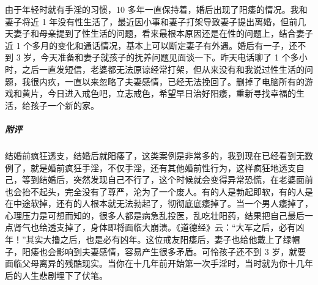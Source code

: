 \begin{case}
    由于年轻时就有手淫的习惯，10 多年一直保持着，婚后出现了阳痿的情况。我和妻子将近 1 年没有性生活了，最近因小事和妻子打架导致妻子提出离婚，但前几天妻子和母亲提到了性生活的问题，看来最根本原因还是在性的问题上，结合妻子近 1 个多月的变化和通话情况，基本上可以断定妻子有外遇。婚后有一子，还不到 3 岁，今天准备和妻子就孩子的抚养问题见面谈一下。昨天电话聊了 1 个多小时，之后一直发短信，老婆都无法原谅经常打架，但从来没有和我说过性生活的问题，我很内疚，一直以来忽略了夫妻感情，已经无法挽回了。删掉了电脑所有的游戏和黄片，今日进入戒色吧，立志戒色，希望早日治好阳痿，重新寻找幸福的生活，给孩子一个新的家。
    \subparagraph{附评} 结婚前疯狂透支，结婚后就阳痿了，这类案例是非常多的，我到现在已经看到无数例了，就是婚前疯狂手淫，不仅手淫，还有其他婚前性行为，这样疯狂地透支自己，等到结婚后，突然发现自己不行了，这个时候就会变得异常恐慌，在老婆面前也会抬不起头，完全没有了尊严，沦为了一个废人。有的人是勃起即软，有的人是在中途软掉，还有的人根本就无法勃起了，彻彻底底痿掉了。当一个男人痿掉了，心理压力是可想而知的，很多人都是病急乱投医，乱吃壮阳药，结果把自己最后一点肾气也给透支掉了，身体即将面临大崩溃。《道德经》云：“大军之后，必有凶年！”其实大撸之后，也是必有凶年。这位戒友阳痿后，妻子也给他戴上了绿帽子，阳痿也会影响到夫妻感情，容易产生很多矛盾。可怜孩子还不到 3 岁，就要面临父母离异的残酷现实。当你在十几年前开始第一次手淫时，当时就为你十几年后的人生悲剧埋下了伏笔。
\end{case}

